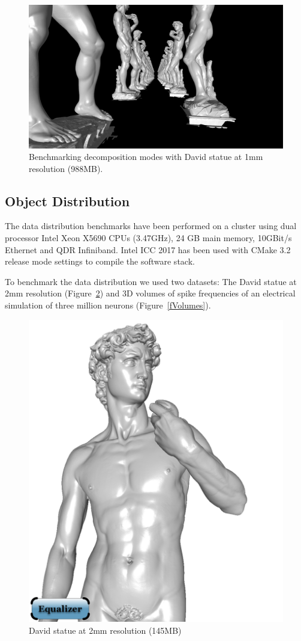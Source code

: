 \documentclass[10pt,journal,compsoc]{IEEEtran}
\newcommand{\fig}[1]{Figure~\ref{#1}}
\begin{document}
\begin{figure}[ht]\center
  \includegraphics[width=.9\columnwidth]{images/benchmark_eqPly2}
  \caption{\label{fBenchmarkEqPly} Benchmarking decomposition modes with David statue at 1mm resolution (988MB).}
\end{figure}

\subsection{Object Distribution}

The data distribution benchmarks have been performed on a cluster using
dual processor Intel Xeon X5690 CPUs (3.47GHz), 24 GB main memory, 10GBit/s
Ethernet and QDR Infiniband. Intel ICC 2017 has been used with CMake 3.2 release
mode settings to compile the software stack.

To benchmark the data distribution we used two datasets: The David statue at 2mm
resolution (\fig{fDavid2mm}) and 3D volumes of spike frequencies of an
electrical simulation of three million neurons (\fig{fVolumes}).

\begin{figure}[ht]\center
  \includegraphics[width=.49\columnwidth]{images/david2mm}
  \caption{\label{fDavid2mm}David statue at 2mm resolution (145MB)}
\end{figure}
\end{document}
